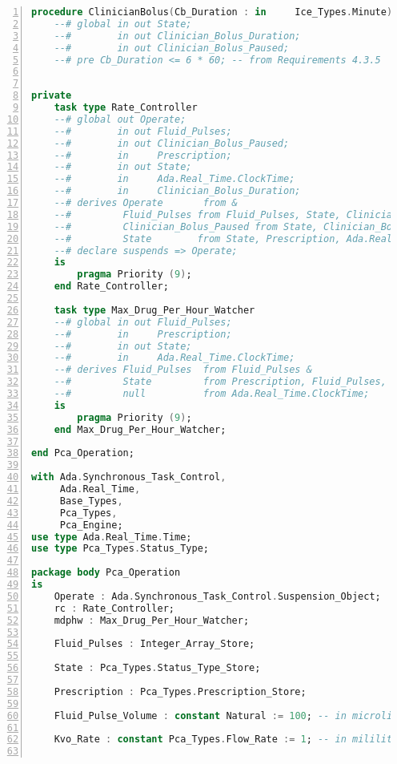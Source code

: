 \begin{lstlisting}[language=ada, gobble=0, numbers=left, caption={\lstinline{Pca_Operation} package}, label={listing:pca_ravenscar:pca_operation}]
    procedure ClinicianBolus(Cb_Duration : in     Ice_Types.Minute);
    --# global in out State;
    --#        in out Clinician_Bolus_Duration;
    --#        in out Clinician_Bolus_Paused;
    --# pre Cb_Duration <= 6 * 60; -- from Requirements 4.3.5


private
    task type Rate_Controller
    --# global out Operate;
    --#        in out Fluid_Pulses;
    --#        in out Clinician_Bolus_Paused;
    --#        in     Prescription;
    --#        in out State;
    --#        in     Ada.Real_Time.ClockTime;
    --#        in     Clinician_Bolus_Duration;
    --# derives Operate       from &
    --#         Fluid_Pulses from Fluid_Pulses, State, Clinician_Bolus_Paused, Ada.Real_Time.ClockTime, Prescription, Clinician_Bolus_Duration &
    --#         Clinician_Bolus_Paused from State, Clinician_Bolus_Paused, Ada.Real_Time.ClockTime, Prescription, Clinician_Bolus_Duration &
    --#         State        from State, Prescription, Ada.Real_Time.ClockTime, Clinician_Bolus_Duration, Clinician_Bolus_Paused;
    --# declare suspends => Operate;
    is
        pragma Priority (9);
    end Rate_Controller;

    task type Max_Drug_Per_Hour_Watcher
    --# global in out Fluid_Pulses;
    --#        in     Prescription;
    --#        in out State;
    --#        in     Ada.Real_Time.ClockTime;
    --# derives Fluid_Pulses  from Fluid_Pulses &
    --#         State         from Prescription, Fluid_Pulses, State &
    --#         null          from Ada.Real_Time.ClockTime;
    is
        pragma Priority (9);
    end Max_Drug_Per_Hour_Watcher;

end Pca_Operation;

with Ada.Synchronous_Task_Control,
     Ada.Real_Time,
     Base_Types,
     Pca_Types,
     Pca_Engine;
use type Ada.Real_Time.Time;
use type Pca_Types.Status_Type;

package body Pca_Operation
is
    Operate : Ada.Synchronous_Task_Control.Suspension_Object;
    rc : Rate_Controller;
    mdphw : Max_Drug_Per_Hour_Watcher;

    Fluid_Pulses : Integer_Array_Store;

    State : Pca_Types.Status_Type_Store;

    Prescription : Pca_Types.Prescription_Store;

    Fluid_Pulse_Volume : constant Natural := 100; -- in microliters

    Kvo_Rate : constant Pca_Types.Flow_Rate := 1; -- in mililiters


\end{lstlisting}
